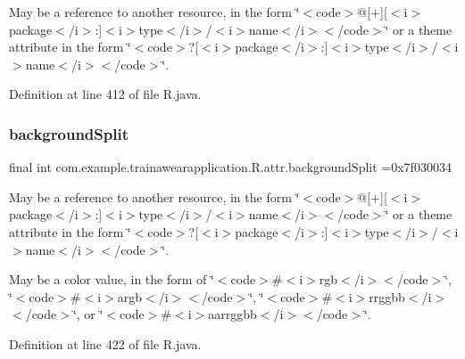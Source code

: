 May be a reference to another resource, in the form \char`\"{}$<$code$>$@\mbox{[}+\mbox{]}\mbox{[}$<$i$>$package$<$/i$>$\+:\mbox{]}$<$i$>$type$<$/i$>$/$<$i$>$name$<$/i$>$$<$/code$>$\char`\"{} or a theme attribute in the form \char`\"{}$<$code$>$?\mbox{[}$<$i$>$package$<$/i$>$\+:\mbox{]}$<$i$>$type$<$/i$>$/$<$i$>$name$<$/i$>$$<$/code$>$\char`\"{}. 

Definition at line 412 of file R.\+java.

\mbox{\label{classcom_1_1example_1_1trainawearapplication_1_1_r_1_1attr_ace96dea1dd5a76c0d3854a09870e0607}} 
\subsubsection{\texorpdfstring{backgroundSplit}{backgroundSplit}}
{\footnotesize\ttfamily final int com.\+example.\+trainawearapplication.\+R.\+attr.\+background\+Split =0x7f030034\hspace{0.3cm}{\ttfamily [static]}}

May be a reference to another resource, in the form \char`\"{}$<$code$>$@\mbox{[}+\mbox{]}\mbox{[}$<$i$>$package$<$/i$>$\+:\mbox{]}$<$i$>$type$<$/i$>$/$<$i$>$name$<$/i$>$$<$/code$>$\char`\"{} or a theme attribute in the form \char`\"{}$<$code$>$?\mbox{[}$<$i$>$package$<$/i$>$\+:\mbox{]}$<$i$>$type$<$/i$>$/$<$i$>$name$<$/i$>$$<$/code$>$\char`\"{}. 

May be a color value, in the form of \char`\"{}$<$code$>$\#$<$i$>$rgb$<$/i$>$$<$/code$>$\char`\"{}, \char`\"{}$<$code$>$\#$<$i$>$argb$<$/i$>$$<$/code$>$\char`\"{}, \char`\"{}$<$code$>$\#$<$i$>$rrggbb$<$/i$>$$<$/code$>$\char`\"{}, or \char`\"{}$<$code$>$\#$<$i$>$aarrggbb$<$/i$>$$<$/code$>$\char`\"{}. 

Definition at line 422 of file R.\+java.

\mbox{\label{classcom_1_1example_1_1trainawearapplication_1_1_r_1_1attr_aedddf993f798dad106bc308957d0f721}} 

